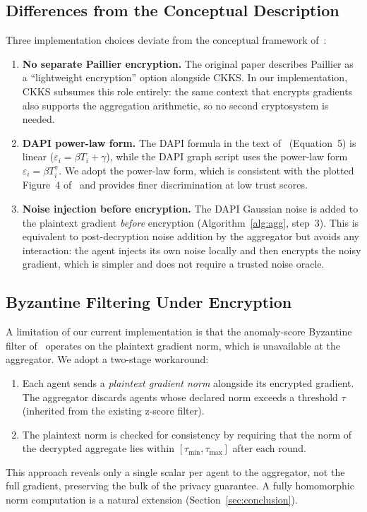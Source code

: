 \documentclass[letterpaper,journal]{IEEEtran}
\newcommand{\eps}{\varepsilon}
\begin{document}
\subsection{Differences from the Conceptual Description}

Three implementation choices deviate from the conceptual framework
of~\cite{frlconf2026}:

\begin{enumerate}
  \item \textbf{No separate Paillier encryption.}
        The original paper describes Paillier as a ``lightweight encryption''
        option alongside CKKS.
        In our implementation, CKKS subsumes this role entirely: the same
        context that encrypts gradients also supports the aggregation
        arithmetic, so no second cryptosystem is needed.

  \item \textbf{DAPI power-law form.}
        The DAPI formula in the text of~\cite{frlconf2026} (Equation~5)
        is linear ($\eps_i = \beta T_i + \gamma$), while the DAPI graph
        script uses the power-law form $\eps_i = \beta T_i^\gamma$.
        We adopt the power-law form, which is consistent with the plotted
        Figure~4 of~\cite{frlconf2026} and provides finer discrimination
        at low trust scores.

  \item \textbf{Noise injection before encryption.}
        The DAPI Gaussian noise is added to the plaintext gradient
        \emph{before} encryption (Algorithm~\ref{alg:agg}, step~3).
        This is equivalent to post-decryption noise addition by the
        aggregator but avoids any interaction: the agent injects its own
        noise locally and then encrypts the noisy gradient, which is
        simpler and does not require a trusted noise oracle.
\end{enumerate}

\subsection{Byzantine Filtering Under Encryption}

A limitation of our current implementation is that the anomaly-score
Byzantine filter of~\cite{frlconf2026} operates on the plaintext gradient
norm, which is unavailable at the aggregator.
We adopt a two-stage workaround:
\begin{enumerate}
  \item Each agent sends a \emph{plaintext gradient norm} alongside its
        encrypted gradient.
        The aggregator discards agents whose declared norm exceeds a threshold
        $\tau$ (inherited from the existing z-score filter).
  \item The plaintext norm is checked for consistency by requiring that
        the norm of the decrypted aggregate lies within $[\tau_{\min},
        \tau_{\max}]$ after each round.
\end{enumerate}
This approach reveals only a single scalar per agent to the aggregator,
not the full gradient, preserving the bulk of the privacy guarantee.
A fully homomorphic norm computation is a natural extension
(Section~\ref{sec:conclusion}).
\end{document}
